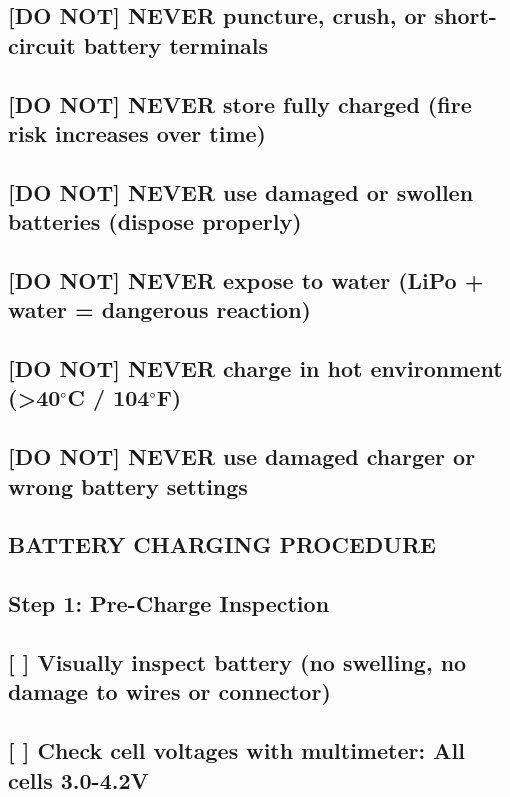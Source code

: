 \documentclass[11pt,letterpaper]{article}
\begin{document}
\subsection*{[DO NOT] NEVER puncture, crush, or short-circuit battery terminals}

\subsection*{[DO NOT] NEVER store fully charged (fire risk increases over time)}

\subsection*{[DO NOT] NEVER use damaged or swollen batteries (dispose properly)}

\subsection*{[DO NOT] NEVER expose to water (LiPo + water = dangerous reaction)}

\subsection*{[DO NOT] NEVER charge in hot environment (>40$^\circ$C / 104$^\circ$F)}

\subsection*{[DO NOT] NEVER use damaged charger or wrong battery settings}

\subsection*{BATTERY CHARGING PROCEDURE}

\subsection*{Step 1: Pre-Charge Inspection}

\subsection*{[ ] Visually inspect battery (no swelling, no damage to wires or connector)}

\subsection*{[ ] Check cell voltages with multimeter: All cells 3.0-4.2V}
\end{document}
